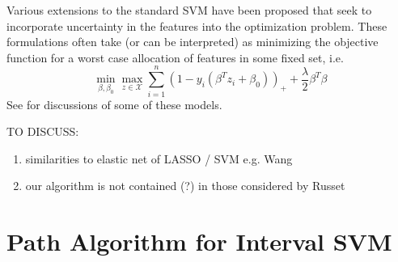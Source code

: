 \documentclass[10pt]{article}
\theoremstyle{definition}
\begin{document}
Various extensions to the standard SVM have been proposed that seek to incorporate uncertainty in the features into the optimization problem. These formulations often take (or can be interpreted) as minimizing the objective function for a worst case allocation of features in some fixed set, i.e.
\begin{equation}
\label{eq:svm_minimax}
\min_{\beta,\beta_0}  \max_{z \in \mathcal{X}} \sum_{i=1}^n (1 - y_i(\beta^Tz_i + \beta_0))_{+} + \frac{\lambda}{2}\beta^T\beta
\end{equation}
See \cite{bhattacharyya2004robust,shivaswamy2006second,ben2011chance} for discussions of some of these models.



TO DISCUSS:
\begin{enumerate}
\item similarities to elastic net of LASSO / SVM e.g. Wang \cite{wang2007hybrid}
\item our algorithm is not contained (?) in those considered by Russet \cite{rosset2007piecewise}
\end{enumerate}


\section{Path Algorithm for Interval SVM}
\end{document}
